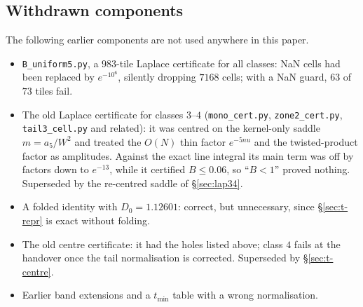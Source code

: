 \subsection{Withdrawn components}\label{app:withdrawn}
The following earlier components are not used anywhere in this paper.
\begin{itemize}
\item \texttt{B\_uniform5.py}, a $983$-tile Laplace certificate for all classes: NaN cells had been replaced by
$e^{-10^6}$, silently dropping $7168$ cells; with a NaN guard, $63$ of $73$ tiles fail.
\item The old Laplace certificate for classes $3$--$4$ (\texttt{mono\_cert.py}, \texttt{zone2\_cert.py},
\texttt{tail3\_cell.py} and related): it was centred on the kernel-only saddle $m=a_5/W^2$ and treated the $O(N)$ thin
factor $e^{-5nu}$ and the twisted-product factor as amplitudes. Against the exact line integral its main term was off by
factors down to $e^{-13}$, while it certified $B\le0.06$, so ``$B<1$'' proved nothing. Superseded by the re-centred saddle
of \S\ref{sec:lap34}.
\item A folded identity with $D_0=1.12601$: correct, but unnecessary, since \S\ref{sec:t-repr} is exact without folding.
\item The old centre certificate: it had the holes listed above; class $4$ fails at the handover once the tail normalisation
is corrected. Superseded by \S\ref{sec:t-centre}.
\item Earlier band extensions and a $t_{\min}$ table with a wrong normalisation.
\end{itemize}
